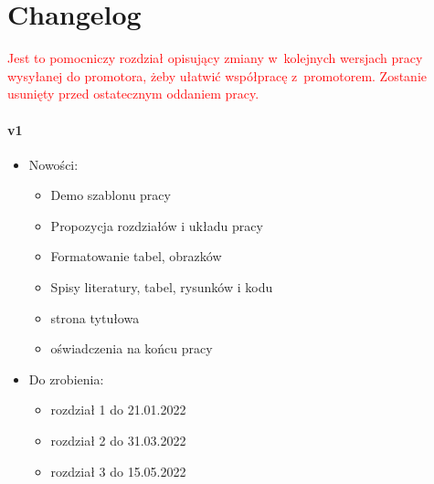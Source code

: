 \chapter*{Changelog}\label{ch:changelog}

\textcolor{red}{
Jest to pomocniczy rozdział opisujący zmiany w~kolejnych wersjach pracy wysyłanej do promotora, żeby ułatwić współpracę z~promotorem.
Zostanie usunięty przed ostatecznym oddaniem pracy.
}
\subsubsection{v1}
\begin{itemize}
    \item Nowości:
    \begin{itemize}
        \item Demo szablonu pracy
        \item Propozycja rozdziałów i układu pracy
        \item Formatowanie tabel, obrazków
        \item Spisy literatury, tabel, rysunków i kodu
        \item strona tytułowa
        \item oświadczenia na końcu pracy
    \end{itemize}
    \item Do zrobienia:
    \begin{itemize}
        \item rozdział 1 do 21.01.2022
        \item rozdział 2 do 31.03.2022
        \item rozdział 3 do 15.05.2022

\end{itemize}
\end{itemize}
